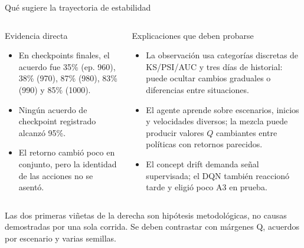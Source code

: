 \documentclass[aspectratio=169,10pt]{beamer}
\begin{document}
\begin{frame}{Qué sugiere la trayectoria de estabilidad}
\begin{columns}[T]
\begin{block}{Evidencia directa}
\begin{itemize}
  \item En checkpoints finales, el acuerdo fue 35\% (ep. 960), 38\% (970),
        87\% (980), 83\% (990) y 85\% (1000).
  \item Ningún acuerdo de checkpoint registrado alcanzó 95\%.
  \item El retorno cambió poco en conjunto, pero la identidad de las acciones
        no se asentó.
\end{itemize}
\end{block}
\begin{block}{Explicaciones que deben probarse}
\begin{itemize}
  \item La observación usa categorías discretas de KS/PSI/AUC y tres días de
        historial: puede ocultar cambios graduales o diferencias entre
        situaciones.
  \item El agente aprende sobre escenarios, inicios y velocidades diversos;
        la mezcla puede producir valores \(Q\) cambiantes entre políticas con
        retornos parecidos.
  \item El concept drift demanda señal supervisada; el DQN también reaccionó
        tarde y eligió poco A3 en prueba.
\end{itemize}
\end{block}
\end{columns}
\vspace{0.2em}
{\footnotesize Las dos primeras viñetas de la derecha son hipótesis
metodológicas, no causas demostradas por una sola corrida. Se deben contrastar
con márgenes Q, acuerdos por escenario y varias semillas.}
\end{frame}
\end{document}
